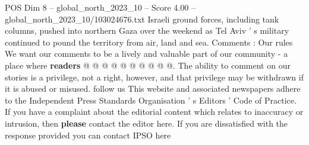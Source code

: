 \begin{textsample}{POS Dim 8 – global\_north\_2023\_10 – Score 4.00 – global\_north\_2023\_10/103024676.txt}
Israeli ground forces, including tank columns, pushed into northern Gaza over the weekend as Tel Aviv ' s military continued to pound the territory from air, land and sea.
Comments : Our rules We want our comments to be a lively and valuable part of our community - a place where \textbf{readers} @ @ @ @ @ @ @ @ @ @.
The ability to comment on our stories is a privilege, not a right, however, and that privilege may be withdrawn if it is abused or misused. follow us This website and associated newspapers adhere to the Independent Press Standards Organisation ' s Editors ' Code of Practice.
If you have a complaint about the editorial content which relates to inaccuracy or intrusion, then \textbf{please} contact the editor here.
If you are dissatisfied with the response provided you can contact IPSO here

\end{textsample}
